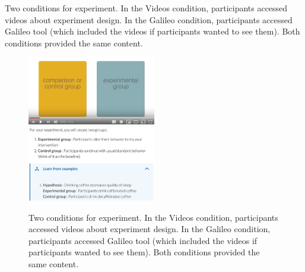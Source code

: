 Two conditions for experiment. In the Videos condition, participants accessed videos about experiment design. In the Galileo condition, participants accessed Galileo tool (which included the videos if participants wanted to see them). Both conditions provided the same content.

\begin{figure}[h] 
  \includegraphics[width=0.5\textwidth]{figures/galileo/galileo-study-1}
  \includegraphics[width=0.5\textwidth]{figures/galileo/galileo-study-2}
  \caption[]
{Two conditions for experiment. In the Videos condition, participants accessed videos about experiment design. In the Galileo condition, participants accessed Galileo tool (which included the videos if participants wanted to see them). Both conditions provided the same content. }
  \label{fig:galileo-study}
\end{figure}

